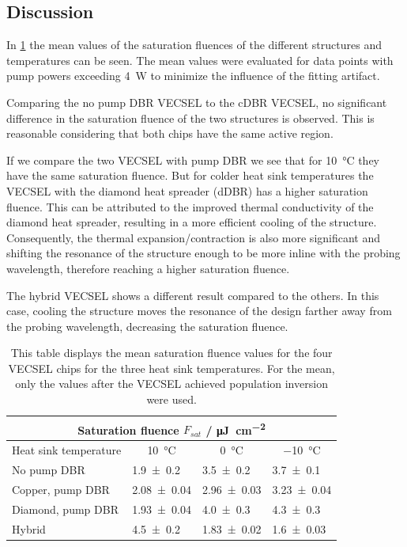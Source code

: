 \subsection*{Discussion}
In \cref{tab:fsat} the mean values of the saturation fluences of the different structures and temperatures can be seen. The mean values were evaluated for data points with pump powers exceeding \qty{4}{\W} to minimize the influence of the fitting artifact.

Comparing the no pump DBR VECSEL to the cDBR VECSEL, no significant difference in the saturation fluence of the two structures is observed. This is reasonable considering that both chips have the same active region.

If we compare the two VECSEL with pump DBR we see that for \qty{10}{\celsius} they have the same saturation fluence. But for colder heat sink temperatures the VECSEL with the diamond heat spreader (dDBR) has a higher saturation fluence. This can be attributed to the improved thermal conductivity of the diamond heat spreader, resulting in a more efficient cooling of the structure. Consequently, the thermal expansion/contraction is also more significant and shifting the resonance of the structure enough to be more inline with the probing wavelength, therefore reaching a higher saturation fluence.

The hybrid VECSEL shows a different result compared to the others. In this case, cooling the structure moves the resonance of the design farther away from the probing wavelength, decreasing the saturation fluence.
\begin{table}[ht]
    \centering
    \begin{tabular}{llll}
        \multicolumn{4}{c}{Saturation fluence $F_{sat}$ / \unit{\micro\J\per\cm\squared}}                  \\ \hline
        Heat sink temperature                  &
        \multicolumn{1}{c}{\qty{10}{\celsius}} &
        \multicolumn{1}{c}{\qty{0}{\celsius}}  &
        \multicolumn{1}{c}{\qty{-10}{\celsius}}                                                            \\ \hline
        No pump DBR                            & \num{1.9\pm0.2}   & \num{3.5\pm0.2}   & \num{3.7\pm0.1}   \\ \hline
        Copper, pump DBR                       & \num{2.08\pm0.04} & \num{2.96\pm0.03} & \num{3.23\pm0.04} \\ \hline
        Diamond, pump DBR                      & \num{1.93\pm0.04} & \num{4.0\pm0.3}   & \num{4.3\pm0.3}   \\ \hline
        Hybrid                                 & \num{4.5\pm0.2}   & \num{1.83\pm0.02} & \num{1.6\pm0.03}
    \end{tabular}
    \caption{This table displays the mean saturation fluence values for the four VECSEL chips for the three heat sink temperatures. For the mean, only the values after the VECSEL achieved population inversion were used.}
    \label{tab:fsat}
\end{table}

